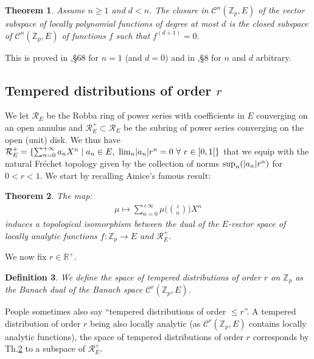 \documentclass[11pt]{amsart}
\def\Z{{\mathbb Z}_p}
\newtheorem{definit}{\bf{Definition}}[subsection]
\newtheorem{thm}[definit]{\bf{Theorem}}
\begin{document}
 
\begin{thm}\label{chikof} 
Assume $n\geq 1$ and $d<n$. The closure in ${\mathcal C}^n(\Z,E)$ of
the vector subspace of locally polynomial functions of degree at most
$d$ is the closed subspace of ${\mathcal C}^n(\Z,E)$ of functions $f$
such that $f^{(d+1)}=0$. 
\end{thm} 
 
This is proved in \cite{Schi},\S68 for $n=1$ (and $d=0$) and in
\cite{Schi2},\S8 for $n$ and $d$ arbitrary.  
 
\subsection{Tempered distributions of order $r$}\label{Yvette} 
 
We let ${\mathcal R}_E$ be the Robba ring of power series with
coefficients in $E$ converging on an open annulus and ${\mathcal
  R}_E^+\subset{\mathcal R}_E$ be the subring of power series
converging on the open (unit) disk. We thus have ${\mathcal
  R}_E^+=\{\sum_{n=0}^{+\infty}a_nX^n\mid a_n\in E,\ {\rm
  lim}_n|a_n|r^n=0\ \forall\ r\in [0,1[\}$ that we equip with the
    natural Fr\'echet topology given by the collection of norms ${\rm
      sup}_n(|a_n|r^n)$ for $0<r<1$. We start by recalling Amice's famous result:  
 
\begin{thm}\label{Yvette2} 
The map: 
\begin{eqnarray}\label{Yvette3} 
\mu\mapsto \sum_{n=0}^{+\infty}\mu\Big({z\choose n}\Big)X^n 
\end{eqnarray} 
induces a topological isomorphism between the dual of the $E$-vector
space of locally analytic functions $f:\Z\rightarrow E$ and ${\mathcal
  R}_E^+$.  
\end{thm} 

We now fix $r\in {\mathbb R}^+$. 
 
\begin{definit} 
We define the space of tempered distributions of order $r$ on $\Z$ as
the Banach dual of the Banach space ${\mathcal C}^r(\Z,E)$.  
\end{definit} 
 
People sometimes also say ``tempered distributions of order $\leq
r$''. A tempered distribution of order $r$ being also locally analytic
(as ${\mathcal C}^r(\Z,E)$ contains locally analytic functions), the
space of tempered distributions of order $r$ corresponds by
Th.\ref{Yvette2} to a subspace of ${\mathcal R}_E^+$.  
 
\end{document}

